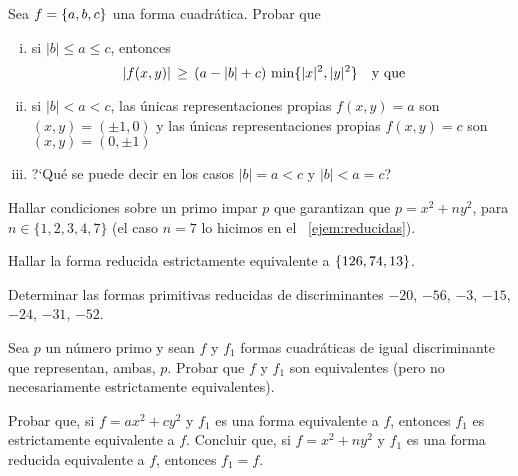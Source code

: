 \begin{ejerReducidas}\label{ejer:reducidas:cota}
	Sea $f=\left\{a,b,c\right\}$ una forma cuadr\'atica. Probar que
	\begin{enumerate}[(i)]
		\item\label{item:ejer:reducidas:cota:i}
			si $|b|\leq a\leq c$, entonces
			\begin{displaymath}
				|f(x,y)|\,\geq\,
					(a-|b|+c)\, \min\{|x|^2,|y|^2\}
				\quad\text{y que}\quad
			\end{displaymath}
		\item\label{item:ejer:reducidas:cota:ii}
			si $|b|<a<c$,
			las \'unicas representaciones propias
			$f(x,y)=a$ son $(x,y)=(\pm 1,0)$ y
			las \'unicas representaciones propias
			$f(x,y)=c$ son $(x,y)=(0,\pm 1)$
		\item\label{item:ejer:reducidas:cota:iii}
			?`Qu\'e se puede decir en los casos $|b|=a<c$ y
			$|b|<a=c$?
	\end{enumerate}
\end{ejerReducidas}

\begin{ejerReducidas}
	Hallar condiciones sobre un primo impar $p$ que garantizan
	que $p=x^2+ny^2$, para $n\in\{1,2,3,4,7\}$ (el caso
	$n=7$ lo hicimos en el \ejemname~\ref{ejem:reducidas}).
\end{ejerReducidas}

\begin{ejerReducidas}
	Hallar la forma reducida estrictamente equivalente a
	$\left\{126,74,13\right\}$.
\end{ejerReducidas}

\begin{ejerReducidas}
	Determinar las formas primitivas reducidas de discriminantes
	$-20$, $-56$, $-3$, $-15$, $-24$, $-31$, $-52$.
\end{ejerReducidas}

\begin{ejerReducidas}\label{ejer:reducidas:representaciones}
	Sea $p$ un n\'umero primo y sean $f$ y $f_1$ formas
	cuadr\'aticas de igual discriminante que representan,
	ambas, $p$. Probar que $f$ y $f_1$ son equivalentes
	(pero no necesariamente estrictamente equivalentes).
\end{ejerReducidas}

\begin{ejerReducidas}\label{ejer:reducidas:representaciones:bis}
	Probar que, si $f=ax^2+cy^2$ y $f_1$ es una forma
	equivalente a $f$, entonces $f_1$ es estrictamente
	equivalente a $f$. Concluir que, si $f=x^2+ny^2$ y
	$f_1$ es una forma reducida equivalente a $f$, entonces
	$f_1=f$.
\end{ejerReducidas}

